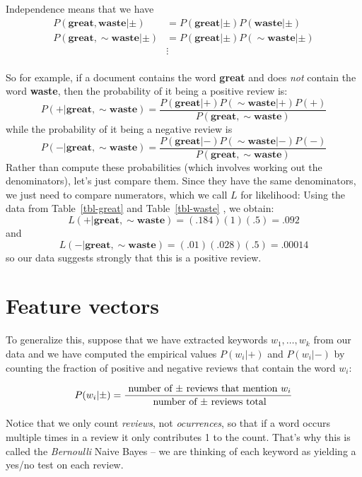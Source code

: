 \documentclass[
  11pt,
  letterpaper,
]{scrbook}
\theoremstyle{plain}
\theoremstyle{plain}
\theoremstyle{remark}
\begin{document}
Independence means that we have \begin{align*}
P(\mathbf{great},\mathbf{waste}|\pm) &= P(\mathbf{great}|\pm)P(\mathbf{waste}|\pm)\\
P(\mathbf{great},\sim\mathbf{waste}|\pm) &= P(\mathbf{great}|\pm)P(\sim\mathbf{waste}|\pm)\\
 &\vdots \\
\end{align*}

So for example, if a document contains the word \textbf{great} and does
\emph{not} contain the word \textbf{waste}, then the probability of it
being a positive review is: \[
P(+|\mathbf{great},\sim\mathbf{waste}) = \frac{P(\mathbf{great}|+)P(\sim\mathbf{waste}|+)P(+)}{P(\mathbf{great},\sim\mathbf{waste})}
\] while the probability of it being a negative review is \[
P(-|\mathbf{great},\sim\mathbf{waste}) = \frac{P(\mathbf{great}|-)P(\sim\mathbf{waste}|-)P(-)}{P(\mathbf{great},\sim\mathbf{waste})}
\] Rather than compute these probabilities (which involves working out
the denominators), let's just compare them. Since they have the same
denominators, we just need to compare numerators, which we call \(L\)
for likelihood: Using the data from Table~\ref{tbl-great} and
Table~\ref{tbl-waste} , we obtain: \[
L(+|\mathbf{great},\sim\mathbf{waste}) = (.184)(1)(.5) = .092
\] and \[
L(-|\mathbf{great},\sim\mathbf{waste}) = (.01)(.028)(.5) = .00014
\] so our data suggests strongly that this is a positive review.

\hypertarget{feature-vectors}{%
\section{Feature vectors}\label{feature-vectors}}

To generalize this, suppose that we have extracted keywords
\(w_1,\ldots, w_k\) from our data and we have computed the empirical
values \(P(w_{i}|+)\) and \(P(w_{i}|-)\) by counting the fraction of
positive and negative reviews that contain the word \(w_{i}\):

\[
P(w_{i}|\pm) = \frac{\hbox{ number of $\pm$ reviews that mention $w_{i}$}}{\hbox{ number of $\pm$ reviews total}}
\]

Notice that we only count \emph{reviews}, not \emph{ocurrences}, so that
if a word occurs multiple times in a review it only contributes 1 to the
count. That's why this is called the \emph{Bernoulli} Naive Bayes -- we
are thinking of each keyword as yielding a yes/no test on each review.
\end{document}
